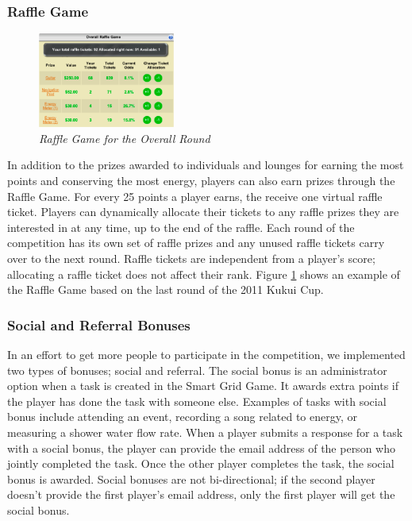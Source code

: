 \documentclass{acm_proc_article-sp}
\begin{document}
\subsubsection{Raffle Game}

\begin{figure}[t!]
  \center
  \includegraphics[width=0.4\textwidth]{raffle-small.eps}
  \caption{\em \small Raffle Game for the Overall Round}
  \label{fig:RaffleGame}
\end{figure}

In addition to the prizes awarded to individuals and lounges for earning the most points and conserving the most energy, players can also earn prizes through the Raffle Game. For every 25 points a player earns, the receive one virtual raffle ticket. Players can dynamically allocate their tickets to any raffle prizes they are interested in at any time, up to the end of the raffle. Each round of the competition has its own set of raffle prizes and any unused raffle tickets carry over to the next round. Raffle tickets are independent from a player's score; allocating a raffle ticket does not affect their rank. Figure \ref{fig:RaffleGame} shows an example of the Raffle Game based on the last round of the 2011 Kukui Cup.

\subsubsection{Social and Referral Bonuses}

In an effort to get more people to participate in the competition, we implemented two types of bonuses; social and referral. The social bonus is an administrator option when a task is created in the Smart Grid Game. It awards extra points if the player has done the task with someone else. Examples of tasks with social bonus include attending an event, recording a song related to energy, or measuring a shower water flow rate. When a player submits a response for a task with a social bonus, the player can provide the email address of the person who jointly completed the task. Once the other player completes the task, the social bonus is awarded. Social bonuses are not bi-directional; if the second player doesn't provide the first player's email address, only the first player will get the social bonus.
\end{document}
